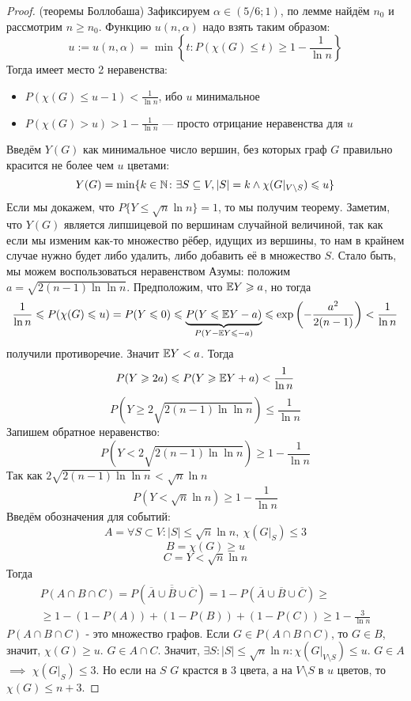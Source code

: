 \begin{proof} (теоремы Боллобаша)
	Зафиксируем $\alpha \in (5/6; 1)$, по лемме найдём $n_0$ и рассмотрим $n \ge n_0$. Функцию $u(n, \alpha)$ надо взять таким образом:
	\[
		u := u(n, \alpha) = \min \left\{t \colon P(\chi(G) \le t) \ge 1 - \frac{1}{\ln n}\right\}
	\]
	Тогда имеет место 2 неравенства:
	\begin{itemize}
		\item \(P(\chi(G) \le u - 1) < \frac{1}{\ln n}\), ибо $u$ минимальное
		
		\item \(P(\chi(G) > u) > 1 - \frac{1}{\ln n}\) --- просто отрицание неравенства для $u$
	\end{itemize}
	Введём $Y(G)$ как минимальное число вершин, без которых граф $G$ правильно красится не более чем $u$ цветами:
	\[
		Y(G) = \min \{k \in \mathbb{N} \colon \exists S \subseteq V, |S| = k \wedge \chi(G|_{V \backslash S}) \leqslant u\}
	\]
	Если мы докажем, что $P\{Y \le \sqrt{n}\ln n\} = 1$, то мы получим теорему. Заметим, что $Y(G)$ является липшицевой по вершинам случайной величиной, так как если мы изменим как-то множество рёбер, идущих из вершины, то нам в крайнем случае нужно будет либо удалить, либо добавить её в множество $S$. Стало быть, мы можем воспользоваться неравенством Азумы: положим $a = \sqrt{2(n - 1)\ln\ln n}$. Предположим, что $\mathbb{E} Y \geqslant a$, но тогда
	\[
		\frac{1}{\ln n} \leqslant P(\chi(G) \leqslant u) = P(Y \leqslant 0) \leqslant \underbrace{P(Y \leqslant \mathbb{E} Y - a)}_{P(Y - \mathbb{E} Y \leqslant -a)} \leqslant \exp\left(-\frac{a^2}{2(n - 1)}\right) < \frac{1}{\ln n}
	\]
	получили противоречие. Значит $\mathbb{E} Y < a$. Тогда
	\[
		P(Y \geqslant 2a) \leqslant P(Y \geqslant \mathbb{E} Y + a) < \frac{1}{\ln n}
	\]
    \[
    P(Y \ge 2\sqrt{2(n-1)\ln{\ln{n}}}) \leq \frac{1}{\ln{n}}
    \]
    Запишем обратное неравенство:
    \[
    P(Y < 2\sqrt{2(n-1)\ln{\ln{n}}}) \ge 1 - \frac{1}{\ln{n}}
    \]
    Так как $2\sqrt{2(n-1)\ln{\ln{n}}}$ < $\sqrt{n} \ln{n}$
    \[
    P(Y < \sqrt{n}\ln{n}) \geq 1 - \frac{1}{\ln{n}}
    \]
    Введём обозначения для событий:
    \[
    A = \forall S \subset V \colon |S| \le \sqrt{n}\ln n,\ \chi(G|_S) \le 3
    \]
    \[
    B = \chi(G) \geq u
    \]
    \[
    C = Y < \sqrt{n} \ln{n}
    \]
Тогда 
\begin{multline*}
P(A \cap B \cap C) = P(\overline{\overline{A} \cup \overline{B} \cup \overline{C}}) = 1 - P(\overline{A} \cup \overline{B} \cup \overline{C})\geq \\ \geq 1 - (1 - P(A)) + (1 - P(B)) + (1-P(C)) \geq 1 - \frac{3}{\ln{n}}
\end{multline*}
$P(A \cap B \cap C)$ - это множество графов. Если $G \in P(A \cap B \cap C)$, то $G \in B$, значит, $\chi(G) \geq u$. $G \in A \cap C$. Значит, $\exists S \colon |S| \le \sqrt{n}\ln{n} \colon \chi(G|_{V \setminus S}) \leq u$. $G \in A$ $\implies$ $\chi(G|_S) \le 3$. Но если на $S$ $G$ крастся в $3$ цвета, а на $V \setminus S$ в $u$ цветов, то $\chi(G) \le n+3$.
\end{proof}